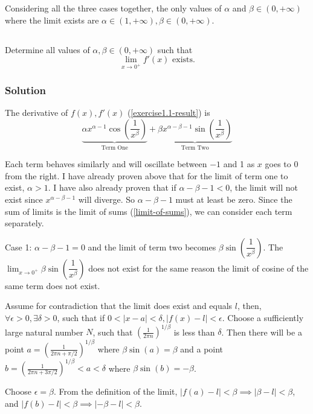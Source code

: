 \documentclass{article}
\begin{document}
Considering all the three cases together, the only values of $\alpha$ and $\beta \in (0,+\infty)$ where the limit exists are
$\alpha \in (1,+\infty), \beta \in (0,+\infty)$.

\subsection{}
Determine all values of $\alpha, \beta \in (0,+\infty)$ such that
\begin{equation*}
	\lim_{x \to 0^+}f'(x) \text{ exists.}
\end{equation*}

\subsubsection{Solution}
The derivative of $f(x), f'(x)$ (\cref{exercise1.1-result}) is
\begin{equation*}
	\underbrace{\alpha x^{\alpha-1}\cos\left(\dfrac{1}{x^\beta}\right)}_{\text{Term One}}+\underbrace{\beta x^{\alpha-\beta-1}\sin\left(\dfrac{1}{x^{\beta}}\right)}_{\text{Term Two}}
\end{equation*}

Each term behaves similarly and will oscillate between $-1$ and 1 as $x$ goes to 0 from the right. I have already proven above that for the limit
of term one to exist, $\alpha > 1$. I have also already proven that if $\alpha-\beta-1<0$, the limit will not exist since $x^{\alpha-\beta-1}$ will
diverge. So $\alpha-\beta-1$ must at least be zero. Since the sum of limits is the limit of sums (\cref{limit-of-sums}), we can consider each
term separately.

Case 1: $\alpha-\beta-1=0$ and the limit of term two becomes $\beta\sin\left(\dfrac{1}{x^\beta}\right)$. The
$\lim_{x \to 0^+}\beta\sin\left(\dfrac{1}{x^\beta}\right)$ does not exist for the same reason the limit of cosine of the same term does not exist.

Assume for contradiction that the limit does exist and equals $l$, then, $\forall \epsilon > 0, \exists \delta > 0$, such that if
$0< |x-a| < \delta, |f(x)-l|<\epsilon$. Choose a sufficiently large natural number $N$, such that $(\frac{1}{2\pi n})^{1/\beta}$ is less than $\delta$.
Then there will be a point $a=(\frac{1}{2\pi n+\pi/2})^{1/\beta}$ where $\beta\sin(a)=\beta$ and a point $b=(\frac{1}{2\pi n+3\pi/2})^{1/\beta}<a<\delta$ where
$\beta\sin(b)=-\beta$.

Choose $\epsilon=\beta$. From the definition of the limit, $|f(a)-l|<\beta \implies |\beta-l|<\beta$, and $|f(b)-l|<\beta \implies | -\beta -l|<\beta$.
\end{document}
